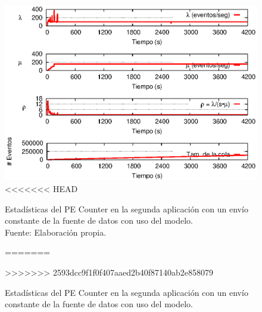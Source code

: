 \clearpage

\begin{figure}[!ht]
    \centering
    \captionsetup{justification=centering}
    \includegraphics[scale=1]{images/exp/app2/uniform/cm/statusCounterPE.eps}
<<<<<<< HEAD
    \caption[Estadísticas del PE Counter en la segunda aplicación con un envío constante de la fuente de datos con uso del modelo.]{Estadísticas del PE Counter en la segunda aplicación con un envío constante de la fuente de datos con uso del modelo.\\Fuente: Elaboración propia.}
=======
    \caption{Estad\'isticas del PE Counter en la segunda aplicaci\'on con un env\'io constante de la fuente de datos con uso del modelo.}
>>>>>>> 2593dcc9f1f0f407aaed2b40f87140ab2e858079
    \label{fig:app2-uniform-statusCounterPE-cm}
\end{figure}


